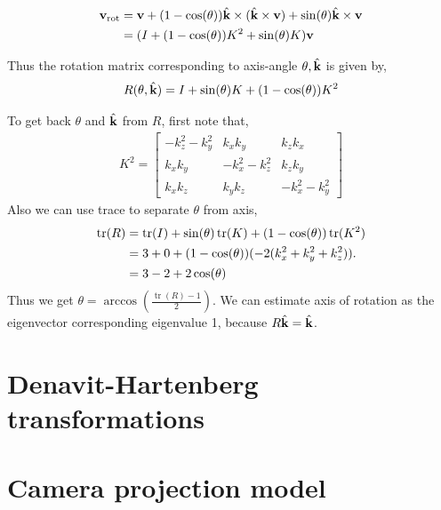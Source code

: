 \documentclass[twocolumn]{article}
\DeclareMathOperator{\tr}{tr}
\begin{document}
\begin{align}
\mathbf{v}_{\text{rot}} &=  \mathbf{v} + (1-\cos(\theta)) \hat{\mathbf{k}} \times (\hat{\mathbf{k}} \times \mathbf{v}) +  \sin(\theta) \hat{\mathbf{k}} \times \mathbf{v}
                    \notag\\
  &= (I + (1 -\cos(\theta)) K^2  + \sin(\theta) K)\mathbf{v}
\end{align}

Thus the rotation matrix corresponding  to axis-angle $\theta, \hat{\mathbf{k}}$ is
given by,
%
\begin{align}
  R(\theta, \hat{\mathbf{k}}) = I + \sin(\theta)K + (1-\cos(\theta))K^2
\end{align}
%

To get back $\theta$ and $\hat{\mathbf{k}}$   from $R$,  first  note that,
% 
\begin{align}
  K^2 =  \begin{bmatrix}
    -k_z^2  - k_y^2  & k_x k_y & k_z k_x \\
    k_xk_y  & -k_x^2- k_z^2 & k_z k_y \\
    k_x k_z  & k_y k_z &  -k_x^2  - k_y^2
    \end{bmatrix} 
\end{align}
% 
Also we can use trace to separate $\theta$ from axis,
%
\begin{align}
  \tr(R) &= \tr(I)  + \sin(\theta)\tr(K) + (1-\cos(\theta))\tr(K^2)
  \notag\\
  &= 3 + 0 + (1-\cos(\theta))(-2(k_x^2 + k_y^2 + k_z^2)).
    \notag\\
  &= 3 - 2 +2\cos(\theta)
\end{align}
%
Thus we get $\theta  =  \arccos(\frac{\tr(R)-1}{2})$. We can estimate axis of
rotation as the  eigenvector corresponding  eigenvalue 1,   because $R\hat{\mathbf{k}}
= \hat{\mathbf{k}}$.

\section{Denavit-Hartenberg  transformations}
\section{Camera  projection model}
\end{document}
